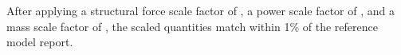 After applying a structural force scale factor of \resultsAOR[forceScaleFactor],
a power scale factor of \resultsAOR[powerScaleFactor],
and a mass scale factor of \resultsAOR[massScaleFactor],
the scaled quantities match within 1\% of the reference model report.


